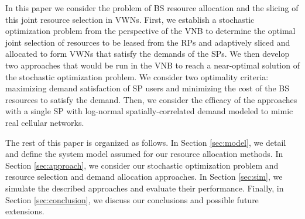 \documentclass[onecolumn,draftcls]{IEEEtran}
\begin{document}
In this paper we consider the problem of BS resource allocation and the slicing of this joint resource selection in VWNs.  First, we establish a stochastic optimization problem from the perspective of the VNB to determine the optimal joint selection of resources to be leased from the RPs and adaptively sliced and allocated to form VWNs that satisfy the demands of the SPs.  We then develop two approaches that would be run in the VNB to reach a near-optimal solution of the stochastic optimization problem.  We consider two optimality criteria: maximizing demand satisfaction of SP users and minimizing the cost of the BS resources to satisfy the demand.  Then, we consider the efficacy of the approaches with a single SP with log-normal spatially-correlated demand modeled to mimic real cellular networks.

The rest of this paper is organized as follows.  In Section \ref{sec:model}, we detail and define the system model assumed for our resource allocation methods.  In Section \ref{sec:approach}, we consider our stochastic optimization problem and resource selection and demand allocation approaches.  In Section \ref{sec:sim}, we simulate the described approaches and evaluate their performance.  Finally, in Section \ref{sec:conclusion}, we discuss our conclusions and possible future extensions.

%
%

\end{document}
